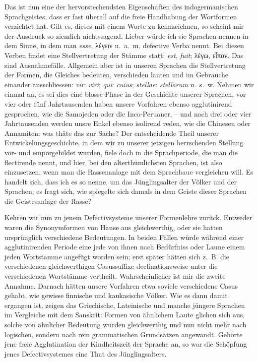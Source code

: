 Das ist nun  eine der hervorstechendsten Eigenschaften des indogermanischen Sprachgeistes, dass er fast überall auf die freie Handhabung der Wortformen verzichtet hat. Gilt es, dieses  mit einem Worte zu kennzeichnen, so scheint mir der Ausdruck  so ziemlich nichtssagend. Lieber würde ich sie  Sprachen nennen in dem Sinne, in dem man \textit{esse}, λέγειν u.~a.~m. defective Verba nennt. Bei diesen Verben findet eine Stellvertretung der Stämme statt: \textit{est}, \textit{fuit}; λέγω, εἶπον. Das sind Ausnahmefälle. Allgemein aber ist in unseren Sprachen die Stellvertretung der Formen, die Gleiches bedeuten, verschieden lauten und im Gebrauche einander ausschliessen: \textit{vir}: \textit{viri}; \textit{qui}: \textit{cuius}; \textit{stellae}: \textit{stellarum} u.~s.~w. Nehmen wir einmal an, es sei dies eine blosse Phase in der Geschichte unserer Sprachen, vor vier oder fünf Jahrtausenden haben unsere Vorfahren ebenso agglutinirend gesprochen, wie die Samojeden oder die \label{sp.399} Inca-Peruaner, – und nach drei oder vier Jahrtausenden werden unsre Enkel ebenso isolirend reden, wie die Chinesen oder Annamiten: was thäte das zur Sache? Der entscheidende Theil unserer Entwickelungsgeschichte,  in dem wir zu unserer jetzigen herrschenden Stellung vor- und emporgebildet wurden, fiele doch in die Sprachperiode, die man die flectirende nennt, und hier, bei den alterthümlichsten Sprachen, ist also einzusetzen, wenn man die Rassenanlage mit dem Sprachbaue vergleichen will. Es handelt sich, dass ich es so nenne, um das Jünglingsalter der Völker und der Sprachen; es fragt sich, wie spiegelte sich damals in dem Geiste dieser Sprachen die Geistesanlage der Rasse?

\largerpage[-1]Kehren wir nun zu jenem Defectivsysteme unserer Formenlehre zu\label{fp.380}rück. Entweder waren die Synonymformen von Hause aus gleichwerthig, oder sie hatten ursprünglich verschiedene Bedeutungen. In beiden Fällen würde während einer agglutinirenden Periode eine jede von ihnen nach Bedürfniss oder Laune einem jeden Wortstamme angefügt worden sein; erst später hätten sich z.~B. die verschiedenen gleichwerthigen Casussuffixe declinationsweise unter die verschiedenen Wortstämme vertheilt. Wahrscheinlicher ist mir die zweite Annahme. Darnach hätten unsere Vorfahren etwa soviele verschiedene Casus gehabt, wie gewisse finnische und kaukasische Völker. Wie es dann damit ergangen ist, zeigen das Griechische, Lateinische und manche jüngere Sprachen im Vergleiche mit dem Sanskrit: Formen von ähnlichem Laute glichen sich aus, solche von ähnlicher Bedeutung wurden gleichwerthig und nun nicht mehr nach logischen, sondern nach rein grammatischen Grundsätzen angewandt. Gehörte jene freie Agglutination der Kindheitszeit der Sprache an, so war die Schöpfung jenes Defectivsystemes eine That des Jünglingsalters.

